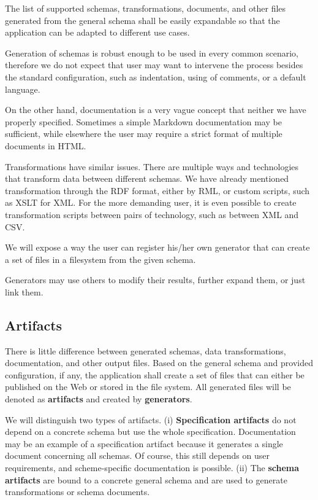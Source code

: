\begin{requirement}
  The list of supported schemas, transformations, documents, and other files generated from the general schema shall be easily expandable so that the application can be adapted to different use cases.
\end{requirement}

Generation of schemas is robust enough to be used in every common scenario, therefore we do not expect that user may want to intervene the process besides the standard configuration, such as indentation, using of comments, or a default language.

On the other hand, documentation is a very vague concept that neither we have properly specified. Sometimes a simple Markdown documentation may be sufficient, while elsewhere the user may require a strict format of multiple documents in HTML.

Transformations have similar issues. There are multiple ways and technologies that transform data between different schemas. We have already mentioned transformation through the RDF format, either by RML, or custom scripts, such as XSLT for XML. For the more demanding user, it is even possible to create transformation scripts between pairs of technology, such as between XML and CSV.

We will expose a way the user can register his/her own generator that can create a set of files in a filesystem from the given schema.

Generators may use others to modify their results, further expand them, or just link them.

\subsection{Artifacts}

There is little difference between generated schemas, data transformations, documentation, and other output files. Based on the general schema and provided configuration, if any, the application shall create a set of files that can either be published on the Web or stored in the file system. All generated files will be denoted as \textbf{artifacts} and created by \textbf{generators}.

We will distinguish two types of artifacts. (i) \textbf{Specification artifacts} do not depend on a concrete schema but use the whole specification. Documentation may be an example of a specification artifact because it generates a single document concerning all schemas. Of course, this still depends on user requirements, and scheme-specific documentation is possible. (ii) The \textbf{schema artifacts} are bound to a concrete general schema and are used to generate transformations or schema documents.


